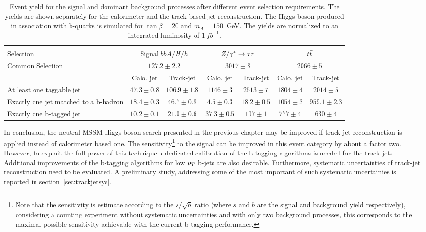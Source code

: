\begin{table}[tp]
	\begin{footnotesize}
	\begin{tabular}{p{3.0cm} |c c| c c| c c }
	\hline
	\hline\\ 
Selection 	& 	\multicolumn{2}{|c|}{Signal $bbA/H/h$ }	&\multicolumn{2}{c|}{$Z/\gamma^*\rightarrow \tau\tau$}	& \multicolumn{2}{c}{$t\bar{t}$}	\\
	[0.5cm]
	\hline
Common Selection	&	\multicolumn{2}{|c|}{$127.2 \pm 2.2$} &\multicolumn{2}{c|}{$3017 \pm 8$} &\multicolumn{2}{c}{$2066 \pm 5$} \\[0.5cm]
			&	Calo. jet		&	Track-jet &Calo. jet	&Track-jet	&Calo. jet	&Track-jet \\[0.5cm]
At least one taggable jet& $47.3 \pm0.8$	&$106.9 \pm1.8$	 &$1146 \pm3 $	&$2513 \pm 7$	&$1804 \pm 4$	&$2014 \pm 5$ \\[1cm]
Exactly one jet matched to a b-hadron& $18.4 \pm 0.3$ & $46.7 \pm 0.8$ & $4.5 \pm 0.3$	&$18.2 \pm 0.5$ 	&$1054 \pm 3$	&$959.1 \pm 2.3$  \\[1cm]
Exactly one b-tagged jet&	$10.2 \pm0.1$	&$21.0 \pm 0.6$	& $37.3 \pm 0.5$ &$107 \pm 1$ &$777 \pm 4$	&$630 \pm4$ \\[1cm]
	\hline
	\hline
	
	\end{tabular}
	\end{footnotesize}
	\caption{Event yield for the signal and dominant background processes after different event selection requirements.
	The yields are shown separately for the calorimeter and the  track-based jet reconstruction.
	The Higgs boson produced in association with b-quarks is simulated for  $\tan\beta=20$ and $m_A=150$~GeV. The yields
		are normalized to an integrated luminosity of $1 ~ fb^{-1}$.}
	\label{tab:tj_cj}
\end{table}

In conclusion, the neutral MSSM Higgs boson search presented in the previous chapter may be improved if track-jet
reconstruction is applied instead of calorimeter based one.
The sensitivity\footnote{Note that the sensitivity is estimate according to the $s/\sqrt{b}$ ratio (where $s$ and 
$b$ are the signal and background yield respectively), considering a counting experiment without systematic uncertainties and 
with only two background processes, this corresponds to the maximal possible sensitivity achievable 
 with the current b-tagging performance.} 
to the signal can be improved in this event
category by about a factor two. However, to exploit the full power of this technique a dedicated calibration of the 
b-tagging algorithms is  needed for the track-jets. Additional improvements of the b-tagging algorithms 
for low $p_{T}$ b-jets are also desirable. Furthermore, 
systematic uncertainties of track-jet reconstruction need to be evaluated. A preliminary study, addressing some
 of the most important of such systematic uncertainies is reported in section~\ref{sec:trackjetsys}.
 
